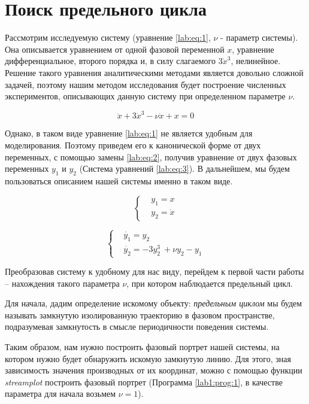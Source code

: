 \chapter{Поиск предельного цикла}

Рассмотрим исследуемую систему (уравнение \ref{lab:eq:1},
$\nu$ - параметр системы). Она описывается
уравнением от одной фазовой переменной $x$, уравнение дифференциальное, второго 
порядка и, в силу слагаемого $3\dot{x}^3$, нелинейное. Решение такого уравнения 
аналитическими методами является довольно сложной задачей, поэтому нашим
методом исследования будет построение численных экспериментов, описывающих
данную систему при определенном параметре $\nu$.

\begin{equation}\label{lab:eq:1}
  \ddot{x} + 3 \dot{x}^3 - \nu\dot{x} + x = 0
\end{equation}

Однако, в таком виде уравнение \ref{lab:eq:1} не является удобным для моделирования.
Поэтому приведем его к канонической форме от двух
переменных, с помощью замены \ref{lab:eq:2}, получив уравнение от двух фазовых
переменных $y_1$ и $y_2$ (Система уравнений \ref{lab:eq:3}). В дальнейшем,
мы будем пользоваться описанием нашей системы именно в таком виде.

\begin{equation}\label{lab:eq:2}
  \begin{cases}
    &y_1 = x \\
    &y_2 = \dot{x}
  \end{cases}
\end{equation}

\begin{equation}\label{lab:eq:3}
  \begin{cases}
    &\dot{y_1} = y_2 \\
    &\dot{y_2} = -3y_2^3\ + \nu y_2 - y_1
  \end{cases}
\end{equation}

Преобразовав систему к удобному для нас виду, перейдем к первой части работы --
нахождения такого параметра $\nu$, при котором наблюдается предельный цикл.

Для начала, дадим определение искомому объекту: \textit{предельным циклом} мы будем
называть замкнутую изолированную траекторию в фазовом пространстве, подразумевая замкнутость
в смысле периодичности поведения системы. 

Таким образом, нам нужно построить фазовый портрет нашей системы, на котором нужно будет
обнаружить искомую замкнутую линию. Для этого, зная зависимость значения производных от их координат,
можно с помощью функции \textit{streamplot}\cite{streamplot} построить фазовый портрет
(Программа \ref{lab1:prog:1}, в качестве параметра для начала возьмем $\nu = 1$). %

